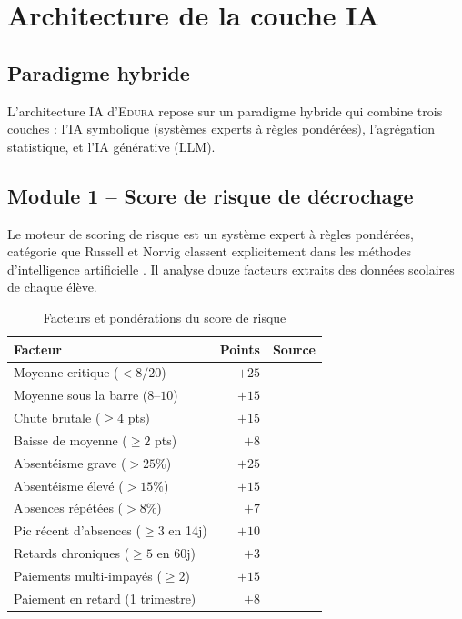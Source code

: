 \documentclass[12pt,a4paper,oneside]{report}
\newcommand{\edura}{\textsc{Edura}}
\begin{document}
\section{Architecture de la couche IA}

\subsection{Paradigme hybride}

L'architecture IA d'\edura{} repose sur un paradigme hybride qui combine trois couches : l'IA symbolique (systèmes experts à règles pondérées), l'agrégation statistique, et l'IA générative (LLM).

\subsection{Module 1 -- Score de risque de décrochage}

Le moteur de scoring de risque est un système expert à règles pondérées, catégorie que Russell et Norvig classent explicitement dans les méthodes d'intelligence artificielle \autocite{russell2020artificial}. Il analyse douze facteurs extraits des données scolaires de chaque élève.

\begin{table}[H]
\centering
\caption{Facteurs et pondérations du score de risque}
\label{tab:risque}
\begin{tabular}{lrc}
\toprule
\textbf{Facteur} & \textbf{Points} & \textbf{Source} \\
\midrule
Moyenne critique ($<8/20$) & $+25$ & \\
Moyenne sous la barre ($8$--$10$) & $+15$ & \autocite{oecd2019pisa} \\
Chute brutale ($\geq 4$ pts) & $+15$ & \\
Baisse de moyenne ($\geq 2$ pts) & $+8$ & \\
Absentéisme grave ($>25\%$) & $+25$ & \autocite{balfanz2007preventing} \\
Absentéisme élevé ($>15\%$) & $+15$ & \autocite{balfanz2007preventing} \\
Absences répétées ($>8\%$) & $+7$ & \\
Pic récent d'absences ($\geq 3$ en 14j) & $+10$ & \autocite{mubarak2020prediction} \\
Retards chroniques ($\geq 5$ en 60j) & $+3$ & \\
Paiements multi-impayés ($\geq 2$) & $+15$ & \\
Paiement en retard (1 trimestre) & $+8$ & \\
\bottomrule
\end{tabular}
\end{table}
\end{document}
